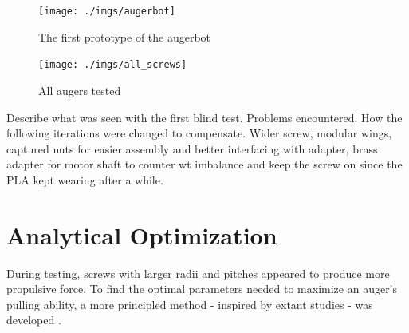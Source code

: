 \documentclass[letterpaper, 11 pt]{article}
\begin{document}
\begin{figure}[H]
\centering
\texttt{[image: ./imgs/augerbot]}
\caption{The first prototype of the augerbot}
\label{fig:augerbot}
\end{figure}

\begin{figure}[H]
\centering
\texttt{[image: ./imgs/all\_screws]}
\caption{All augers tested}
\label{fig:all_screws}
\end{figure}

Describe what was seen with the first blind test. Problems encountered. 
How the following iterations were changed to compensate. 
Wider screw, modular wings, captured nuts for easier assembly and better interfacing with adapter, brass adapter for motor shaft to counter wt imbalance and keep the screw on since the PLA kept wearing after a while.

\section{Analytical Optimization}
During testing, screws with larger radii and pitches appeared to produce more propulsive force. To find the optimal parameters needed to maximize an auger's pulling ability, a more principled method - inspired by extant studies - was developed \cite{Melo,Chen}.
\end{document}
